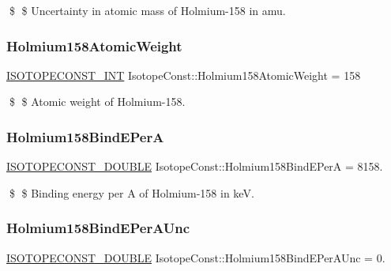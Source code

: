 \$ \$ Uncertainty in atomic mass of Holmium-\/158 in amu. \mbox{\label{group___isotope_const-_holmium-_ho158_gaa99970ed2795b5d3bf22106cac8e5294}} 
\subsubsection{\texorpdfstring{Holmium158\+Atomic\+Weight}{Holmium158AtomicWeight}}
{\footnotesize\ttfamily \mbox{\hyperlink{group___isotope_const-_macros_ga5f18360b3e99483a35c32d789e62621c}{I\+S\+O\+T\+O\+P\+E\+C\+O\+N\+S\+T\+\_\+\+I\+NT}} Isotope\+Const\+::\+Holmium158\+Atomic\+Weight = 158}

\$ \$ Atomic weight of Holmium-\/158. \mbox{\label{group___isotope_const-_holmium-_ho158_gaa4d02ee9ea6e123ab1ef9b2781f90e66}} 
\subsubsection{\texorpdfstring{Holmium158\+Bind\+E\+PerA}{Holmium158BindEPerA}}
{\footnotesize\ttfamily \mbox{\hyperlink{group___isotope_const-_macros_ga8f45a7272ce02c0b4c65c44636ed719a}{I\+S\+O\+T\+O\+P\+E\+C\+O\+N\+S\+T\+\_\+\+D\+O\+U\+B\+LE}} Isotope\+Const\+::\+Holmium158\+Bind\+E\+PerA = 8158.}

\$ \$ Binding energy per A of Holmium-\/158 in keV. \mbox{\label{group___isotope_const-_holmium-_ho158_gaf9279bc261823de3f7cf3b645b30b2c6}} 
\subsubsection{\texorpdfstring{Holmium158\+Bind\+E\+Per\+A\+Unc}{Holmium158BindEPerAUnc}}
{\footnotesize\ttfamily \mbox{\hyperlink{group___isotope_const-_macros_ga8f45a7272ce02c0b4c65c44636ed719a}{I\+S\+O\+T\+O\+P\+E\+C\+O\+N\+S\+T\+\_\+\+D\+O\+U\+B\+LE}} Isotope\+Const\+::\+Holmium158\+Bind\+E\+Per\+A\+Unc = 0.}

